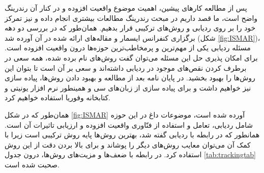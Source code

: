 \begin{table}
	\centering
{}%
\caption{مقایسه روش‌های ردیابی} \label{tab:trackingtab}
\end{table}

پس از مطالعه کارهای پیشین، اهمیت موضوع واقعیت افزوده و در کنار آن رندرینگ واضح است، ما قصد داریم در مبحث رندرینگ مطالعات بیشتری انجام داده و نیز تمرکز خود را بر روی ردیابی و روش‌های ترکیبی قرار بدهیم. همان‌طور که در بررسی دو دهه برگزاری کنفرانس ایسمار\cite{ismar} و مقاله‌های ارائه شده در آن آورده شد (شکل \ref{fig:ISMAR})، مسئله ردیابی یکی از مهم‌ترین و پرمخاطب‌ترین حوزه‌ها درون واقعیت افزوده است. برای امکان پذیری حل این مسئله می‌توان گفت روش‌های نام برده شده، همه سعی در برطرف کردن نقص‌های موجود در ردیابی داشته‌اند و سعی بر آن است تا بتوان این روش‌ها را بهبود بخشید. در پایان نامه بعد از مطالعه و بهبود دادن روش‌ها، پیاده سازی نیز خواهیم داشت و برای پیاده سازی از زبان‌های سی و همینطور نرم افزار یونیتی و کتابخانه وفوریا استفاده خواهیم کرد.

همان‌طور که در شکل \ref{fig:ISMAR} آورده شده است، موضوعات داغ در این حوزه شامل ردیابی، تعامل و استفاده از فنّاوری واقعیت افزوده و ارزیابی تاثیرات آن است. همانطور که در رابطه با ردیابی گفته شد، بهترین روش‌ها پایه روش ترکیبی است زیرا با کمک آن می‌توان معایب روش‌های دیگر را پوشاند و برای بالا بردن دقت از این روش استفاده کرد. در رابطه با ضعف‌ها و مزیت‌های روش‌ها، درون جدول \ref{tab:trackingtab} صحبت شده است.
